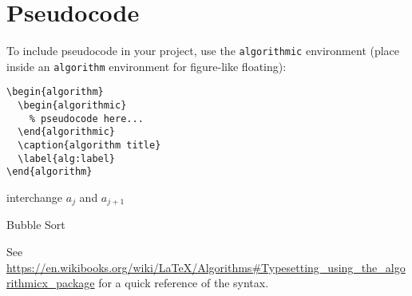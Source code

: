 
\chapter{Pseudocode}
\label{app:pseudocode}

To include pseudocode in your project, use the \texttt{algorithmic} environment (place inside an \texttt{algorithm} environment for figure-like floating):
%
\begin{verbatim}
\begin{algorithm}
  \begin{algorithmic}
    % pseudocode here...
  \end{algorithmic}
  \caption{algorithm title}
  \label{alg:label}
\end{algorithm}
\end{verbatim}

\begin{algorithm}
  \begin{algorithmic}
    interchange \(a_{j}\) and \(a_{j+1}\)
    \EndIf
    \EndFor
    \EndFor
    \EndProcedure
  \end{algorithmic}
  \caption{Bubble Sort}
  \label{alg:some}
\end{algorithm}

See \url{https://en.wikibooks.org/wiki/LaTeX/Algorithms#Typesetting_using_the_algorithmicx_package} for a quick reference of the syntax.